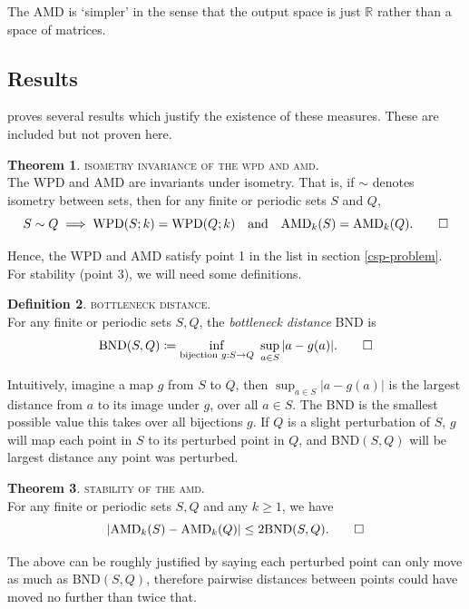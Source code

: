 \documentclass[11pt]{article}
\theoremstyle{definition}
\newtheorem{defi/}{Definition}[section]
\newenvironment{defi}
  {\renewcommand{\qedsymbol}{$\blacktriangleleft$}%
   \pushQED{\qed}\begin{defi/}}
  {\popQED\end{defi/}}
\newtheorem{theorem/}[defi/]{Theorem}
\newenvironment{theorem}
  {\renewcommand{\qedsymbol}{$\blacktriangleleft$}%
   \pushQED{\qed}\begin{theorem/}}
  {\popQED\end{theorem/}}
\begin{document}
The AMD is `simpler' in the sense that the output space is just $\mathbb{R}$ rather than a space of matrices. 

\subsection{Results}

\cite{2020-Mosca-Kurlin, mosca2020average} proves several results which justify the existence of these measures. These are included but not proven here.

\begin{theorem}\textsc{isometry invariance of the wpd and amd.}\\
The WPD and AMD are invariants under isometry. That is, if $\sim$ denotes isometry between sets, then for any finite or periodic sets $S$ and $Q$,
\[
S \sim Q \implies \text{WPD}(S;k) = \text{WPD}(Q;k) \quad \text{and} \quad \text{AMD}_k(S) = \text{AMD}_k(Q). \qedhere
\]
\end{theorem}

Hence, the WPD and AMD satisfy point 1 in the list in section \ref{csp-problem}. For stability (point 3), we will need some definitions.

\begin{defi}\textsc{bottleneck distance.}\\
For any finite or periodic sets $S,Q$, the \emph{bottleneck distance} BND is
\[
\text{BND}\displaystyle(S,Q) \coloneqq \inf_{\text{bijection } g:S\rightarrow Q}\,\, \sup_{a\in S}|a-g(a)|.\qedhere
\]
\end{defi}

Intuitively, imagine a map $g$ from $S$ to $Q$, then $\sup_{a\in S}|a-g(a)|$ is the largest distance from $a$ to its image under $g$, over all $a\in S$. The BND is the smallest possible value this takes over all bijections $g$. If $Q$ is a slight perturbation of $S$, $g$ will map each point in $S$ to its perturbed point in $Q$, and BND$(S,Q)$ will be largest distance any point was perturbed.

\begin{theorem}\textsc{stability of the amd.}\\
For any finite or periodic sets $S,Q$ and any $k\geq 1$, we have
\[
|\text{AMD}_k(S) - \text{AMD}_k(Q)| \leq 2\text{BND}(S,Q). \qedhere
\]
\end{theorem}

The above can be roughly justified by saying each perturbed point can only move as much as BND$(S,Q)$, therefore pairwise distances between points could have moved no further than twice that.
\end{document}

